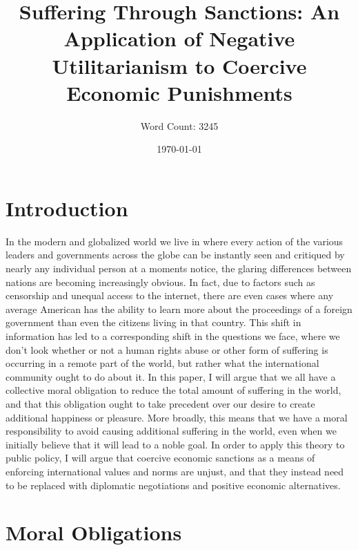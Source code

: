 \documentclass[12pt]{article}
\title{Suffering Through Sanctions: An Application of Negative Utilitarianism to Coercive Economic Punishments}
\author{Word Count: 3245}
\date{\today}
\begin{document}
\maketitle
\newpage
{}

\section*{Introduction}
In the modern and globalized world we live in where every action of the various leaders and governments across the globe can be instantly seen and critiqued by nearly any individual person at a moments notice, the glaring differences between nations are becoming increasingly obvious.
In fact, due to factors such as censorship and unequal access to the internet, there are even cases where any average American has the ability to learn more about the proceedings of a foreign government than even the citizens living in that country.
This shift in information has led to a corresponding shift in the questions we face, where we don't look whether or not a human rights abuse or other form of suffering is occurring in a remote part of the world, but rather what the international community ought to do about it.
In this paper, I will argue that we all have a collective moral obligation to reduce the total amount of suffering in the world, and that this obligation ought to take precedent over our desire to create additional happiness or pleasure.
More broadly, this means that we have a moral responsibility to avoid causing additional suffering in the world, even when we initially believe that it will lead to a noble goal.
In order to apply this theory to public policy, I will argue that coercive economic sanctions as a means of enforcing international values and norms are unjust, and that they instead need to be replaced with diplomatic negotiations and positive economic alternatives.

\section*{Moral Obligations}
\end{document}
